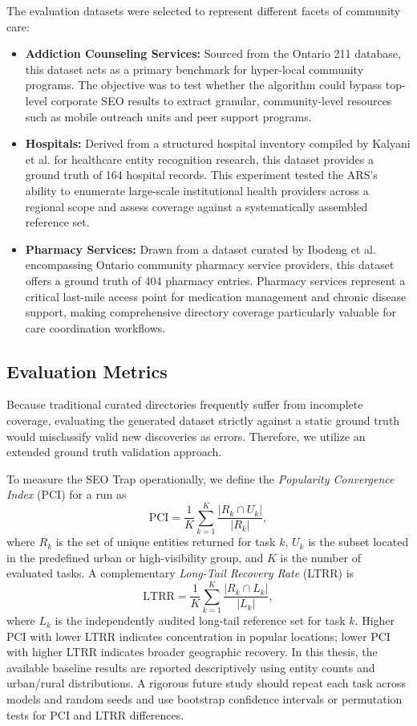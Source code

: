 \documentclass[12pt,oneside]{report}
\begin{document}
The evaluation datasets were selected to represent different facets of community care:
\begin{itemize}
    \item \textbf{Addiction Counseling Services:} Sourced from the Ontario 211 database\cite{26}, this dataset acts as a primary benchmark for hyper-local community programs. The objective was to test whether the algorithm could bypass top-level corporate SEO results to extract granular, community-level resources such as mobile outreach units and peer support programs.
    \item \textbf{Hospitals:} Derived from a structured hospital inventory compiled by Kalyani et al. \cite{21} for healthcare entity recognition research, this dataset provides a ground truth of 164 hospital records. This experiment tested the ARS's ability to enumerate large-scale institutional health providers across a regional scope and assess coverage against a systematically assembled reference set.
    \item \textbf{Pharmacy Services:} Drawn from a dataset curated by Ibodeng et al. \cite{22} encompassing Ontario community pharmacy service providers, this dataset offers a ground truth of 404 pharmacy entries. Pharmacy services represent a critical last-mile access point for medication management and chronic disease support, making comprehensive directory coverage particularly valuable for care coordination workflows.
\end{itemize}
\subsection{Evaluation Metrics}
Because traditional curated directories frequently suffer from incomplete coverage, evaluating the generated dataset strictly against a static ground truth would misclassify valid new discoveries as errors. Therefore, we utilize an extended ground truth validation approach.

To measure the SEO Trap operationally, we define the \textit{Popularity Convergence Index} (PCI) for a run as
\[
\mathrm{PCI}=\frac{1}{K}\sum_{k=1}^{K}\frac{|R_k\cap U_k|}{|R_k|},
\]
where $R_k$ is the set of unique entities returned for task $k$, $U_k$ is the subset located in the predefined urban or high-visibility group, and $K$ is the number of evaluated tasks. A complementary \textit{Long-Tail Recovery Rate} (LTRR) is
\[
\mathrm{LTRR}=\frac{1}{K}\sum_{k=1}^{K}\frac{|R_k\cap L_k|}{|L_k|},
\]
where $L_k$ is the independently audited long-tail reference set for task $k$. Higher PCI with lower LTRR indicates concentration in popular locations; lower PCI with higher LTRR indicates broader geographic recovery. In this thesis, the available baseline results are reported descriptively using entity counts and urban/rural distributions. A rigorous future study should repeat each task across models and random seeds and use bootstrap confidence intervals or permutation tests for PCI and LTRR differences.
\end{document}

